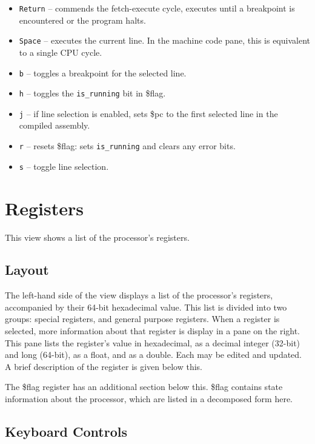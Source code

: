\documentclass[10pt]{article}
\begin{document}
    \begin{itemize}
        \item \texttt{Return} -- commends the fetch-execute cycle, executes until a breakpoint is encountered or the program halts.
        \item \texttt{Space} -- executes the current line.
        In the machine code pane, this is equivalent to a single CPU cycle.
        \item \texttt{b} -- toggles a breakpoint for the selected line.
        \item \texttt{h} -- toggles the \texttt{is\_running} bit in \$flag.
        \item \texttt{j} -- if line selection is enabled, sets \$pc to the first selected line in the compiled assembly.
        \item \texttt{r} -- resets \$flag: sets \texttt{is\_running} and clears any error bits.
        \item \texttt{s} -- toggle line selection.
    \end{itemize}

    \section{Registers}

    This view shows a list of the processor's registers.

    \subsection{Layout}

    The left-hand side of the view displays a list of the processor's registers, accompanied by their 64-bit hexadecimal value.
    This list is divided into two groups: special registers, and general purpose registers.
    When a register is selected, more information about that register is display in a pane on the right.
    This pane lists the register's value in hexadecimal, as a decimal integer (32-bit) and long (64-bit), as a float, and as a double.
    Each may be edited and updated.
    A brief description of the register is given below this.

    The \$flag register has an additional section below this.
    \$flag contains state information about the processor, which are listed in a decomposed form here.

    \subsection{Keyboard Controls}
\end{document}
